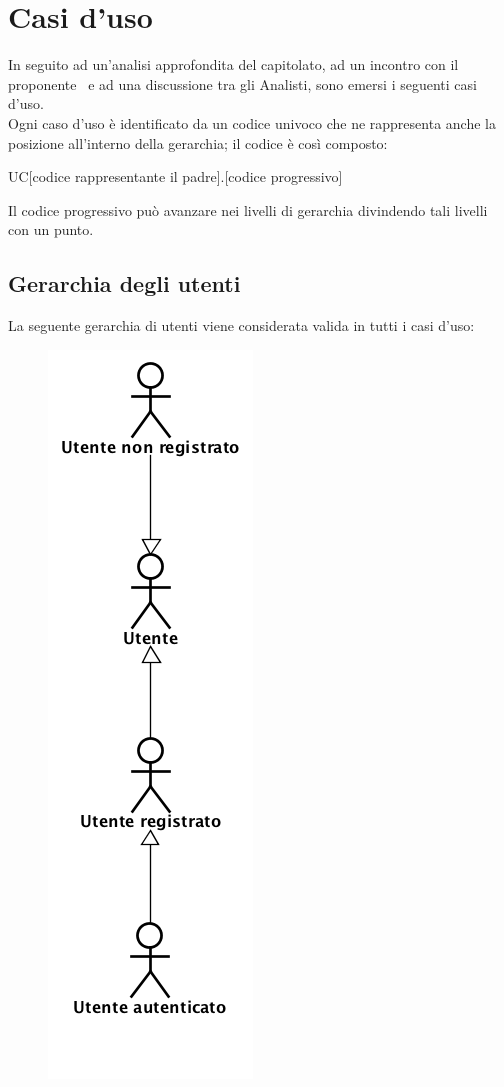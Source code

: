 \section{Casi d'uso}
In seguito ad un'analisi approfondita del capitolato, ad un incontro con il proponente \Zucchetti\ e ad una discussione tra gli Analisti, sono emersi i seguenti casi d'uso.\\
Ogni caso d'uso è identificato da un codice univoco che ne rappresenta anche la posizione all'interno della gerarchia; il codice è così composto:
\begin{center}
UC[codice rappresentante il padre].[codice progressivo]
\end{center}
Il codice progressivo può avanzare nei livelli di gerarchia divindendo tali livelli con un punto.
\newpage
\subsection{Gerarchia degli utenti}
La seguente gerarchia di utenti viene considerata valida in tutti i casi d'uso:
\begin{figure}[h]
\begin{center}
	 \includegraphics[scale=0.5]{diagram/gerarchia.png}
\end{center}
\end{figure}
\newpage


